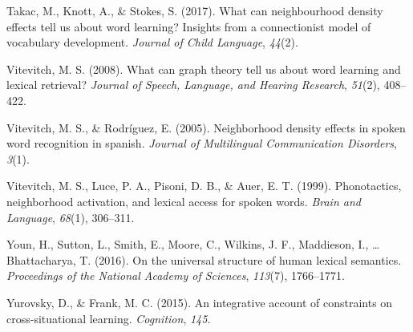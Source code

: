 \documentclass[english,floatsintext,man]{apa6}
\theoremstyle{definition}
\theoremstyle{definition}
\theoremstyle{definition}
\theoremstyle{remark}
\begin{document}
\hypertarget{ref-takac2017}{}
Takac, M., Knott, A., \& Stokes, S. (2017). What can neighbourhood
density effects tell us about word learning? Insights from a
connectionist model of vocabulary development. \emph{Journal of Child
Language}, \emph{44}(2).

\hypertarget{ref-vitevitch2008}{}
Vitevitch, M. S. (2008). What can graph theory tell us about word
learning and lexical retrieval? \emph{Journal of Speech, Language, and
Hearing Research}, \emph{51}(2), 408--422.

\hypertarget{ref-vitevitch2005}{}
Vitevitch, M. S., \& Rodríguez, E. (2005). Neighborhood density effects
in spoken word recognition in spanish. \emph{Journal of Multilingual
Communication Disorders}, \emph{3}(1).

\hypertarget{ref-vitevitch1999}{}
Vitevitch, M. S., Luce, P. A., Pisoni, D. B., \& Auer, E. T. (1999).
Phonotactics, neighborhood activation, and lexical access for spoken
words. \emph{Brain and Language}, \emph{68}(1), 306--311.

\hypertarget{ref-youn2016}{}
Youn, H., Sutton, L., Smith, E., Moore, C., Wilkins, J. F., Maddieson,
I., \ldots{} Bhattacharya, T. (2016). On the universal structure of
human lexical semantics. \emph{Proceedings of the National Academy of
Sciences}, \emph{113}(7), 1766--1771.

\hypertarget{ref-yurovsky2015}{}
Yurovsky, D., \& Frank, M. C. (2015). An integrative account of
constraints on cross-situational learning. \emph{Cognition}, \emph{145}.
\end{document}
